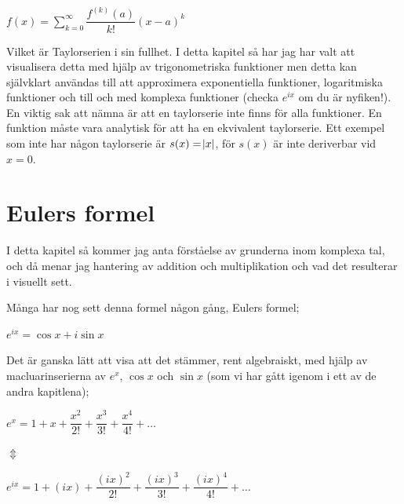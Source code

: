 \documentclass[10pt, a4paper]{amsart}
\begin{document}
\hspace{5ex}
$ f(x) = \sum\limits_{k=0}^{\infty} \dfrac{f^{(k)}(a)}{k!}(x-a)^k $ 
\vspace{24pt plus 4pt minus 4pt}

Vilket är Taylorserien i sin fullhet. I detta kapitel så har jag har valt att visualisera detta med hjälp av trigonometriska funktioner men detta kan självklart användas till att approximera exponentiella funktioner, logaritmiska funktioner och till och med komplexa funktioner (checka $ e^{ix} $ om du är nyfiken!).
En viktig sak att nämna är att en taylorserie inte finns för alla funktioner. En funktion måste vara analytisk för att ha en ekvivalent taylorserie. 
Ett exempel som inte har någon taylorserie är $ s(x) = \abs{x} $, för $ s(x) $ är inte deriverbar vid $ x = 0 $.

\newpage
\section{Eulers formel}
\bigskip

I detta kapitel så kommer jag anta förståelse av grunderna inom komplexa tal, och då menar jag hantering av addition och multiplikation och vad det resulterar i visuellt sett.
\bigskip

Många har nog sett denna formel någon gång, Eulers formel;
\vspace{24pt plus 4pt minus 4pt}

\hspace{5ex}
$ e^{ix} = \cos x + i\sin x $
\bigskip
\bigskip

Det är ganska lätt att visa att det stämmer, rent algebraiskt, med hjälp av macluarinserierna av $ e^x $, $ \cos x $ och $ \sin x $ (som vi har gått igenom i ett av de andra kapitlena);
\vspace{24pt plus 4pt minus 4pt}

\hspace{5ex}
$ e^x = 1 + x + \dfrac{x^2}{2!} + \dfrac{x^3}{3!} + \dfrac{x^4}{4!} + \dotso $
\bigskip

\hspace{10ex}
$ \Updownarrow $
\bigskip

\hspace{5ex}
$ e^{ix} = 1 + (ix) + \dfrac{(ix)^2}{2!} + \dfrac{(ix)^3}{3!} + \dfrac{(ix)^4}{4!} + \dotso $
\bigskip
\end{document}

